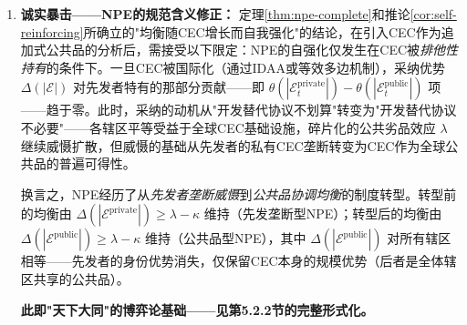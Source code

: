 \documentclass[12pt,a4paper]{ctexart}
\theoremstyle{definition}
\theoremstyle{remark}
\begin{document}
\begin{corollary}
\begin{enumerate}[label=(\roman*), itemsep=6pt]
\item \textbf{诚实暴击——NPE的规范含义修正：} 定理\ref{thm:npe-complete}和推论\ref{cor:self-reinforcing}所确立的"均衡随CEC增长而自我强化"的结论，在引入CEC作为追加式公共品的分析后，需接受以下限定：NPE的自强化仅发生在CEC被\textit{排他性持有}的条件下。一旦CEC被国际化（通过IDAA或等效多边机制），采纳优势 $\Delta(|\mathcal{E}|)$ 对先发者特有的那部分贡献——即 $\theta(|\mathcal{E}_t^{\text{private}}|) - \theta(|\mathcal{E}_t^{\text{public}}|)$ 项——趋于零。此时，采纳的动机从"开发替代协议不划算"转变为"开发替代协议不必要"——各辖区平等受益于全球CEC基础设施，碎片化的公共劣品效应 $\lambda$ 继续威慑扩散，但威慑的基础从先发者的私有CEC垄断转变为CEC作为全球公共品的普遍可得性。

换言之，NPE经历了从\textit{先发者垄断威慑}到\textit{公共品协调均衡}的制度转型。转型前的均衡由 $\Delta(|\mathcal{E}^{\text{private}}|) \geq \lambda - \kappa$ 维持（先发垄断型NPE）；转型后的均衡由 $\Delta(|\mathcal{E}^{\text{public}}|) \geq \lambda - \kappa$ 维持（公共品型NPE），其中 $\Delta(|\mathcal{E}^{\text{public}}|)$ 对所有辖区相等——先发者的身份优势消失，仅保留CEC本身的规模优势（后者是全体辖区共享的公共品）。

\textbf{此即"天下大同"的博弈论基础——见第5.2.2节的完整形式化。}
\end{enumerate}
\end{corollary}
\end{document}
